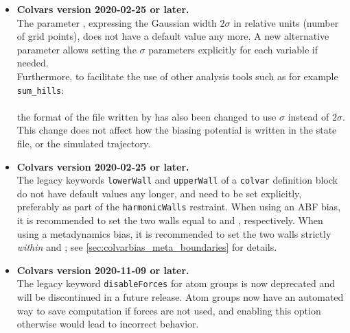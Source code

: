 \begin{itemize}
\item \textbf{Colvars version 2020-02-25 or later.}\\
  The parameter , expressing the Gaussian width $2\sigma$ in relative units (number of grid points), does not have a default value any more.
  A new alternative parameter  allows setting the $\sigma$ parameters explicitly for each variable if needed.\\
  Furthermore, to facilitate the use of other analysis tools such as for example \texttt{sum\_hills}:\\
\\
  the format of the file written by  has also been changed to use $\sigma$ instead of $2\sigma$.
  This change does not affect how the biasing potential is written in the state file, or the simulated trajectory.

\item \textbf{Colvars version 2020-02-25 or later.}\\
  The legacy keywords \texttt{lowerWall} and \texttt{upperWall} of a \texttt{colvar} definition block do not have default values any longer, and need to be set explicitly, preferably as part of the \texttt{harmonicWalls} restraint.
  When using an ABF bias, it is recommended to set the two walls equal to  and , respectively.
  When using a metadynamics bias, it is recommended to set the two walls strictly \emph{within}  and ; see \ref{sec:colvarbias_meta_boundaries} for details.

\item \textbf{Colvars version 2020-11-09 or later.}\\
  The legacy keyword \texttt{disableForces} for atom groups is now deprecated and will be discontinued in a future release.
  Atom groups now have an automated way to save computation if forces are not used, and enabling this option otherwise would lead to incorrect behavior.

\end{itemize}

